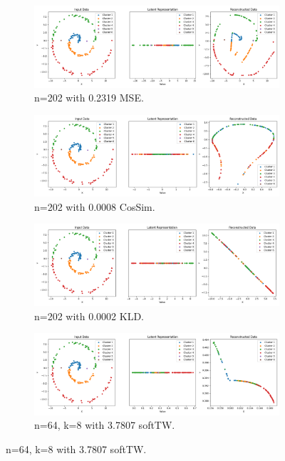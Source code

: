 \begin{figure}[htbp]
  \centering
  \begin{subfigure}[b]{1.0\textwidth}
    \centering
    \includegraphics[width=\linewidth]{images/RQ2/mse/2DSwissRoll_-1_0.2319.png}
    \caption{n=202 with 0.2319 MSE.}
    \label{fig:RQ2/mse/2DSwissRoll}
  \end{subfigure}
  \hfill
  \begin{subfigure}[b]{1.0\textwidth}
    \centering
    \includegraphics[width=\linewidth]{images/RQ2/csi/2DSwissRoll_2_0.0008.png}
    \caption{n=202 with 0.0008 CosSim.}
    \label{fig:RQ2/csi/2DSwissRoll}
  \end{subfigure}
  \hfill
  \begin{subfigure}[b]{1.0\textwidth}
    \centering
    \includegraphics[width=\linewidth]{images/RQ2/kld/2DSwissRoll_-1_0.0002.png}
    \caption{n=202 with 0.0002 KLD.}
    \label{fig:RQ2/kld/2DSwissRoll}
  \end{subfigure}
  \hfill
  \begin{subfigure}[b]{1.0\textwidth}
    \centering
    \includegraphics[width=\linewidth]{images/RQ2/tru/2DSwissRoll_64n_8k_3.7807.png}
    \caption{n=64, k=8 with 3.7807 softTW.}
    \label{fig:RQ2/tru/2DSwissRoll}
  \end{subfigure}


\end{figure}
